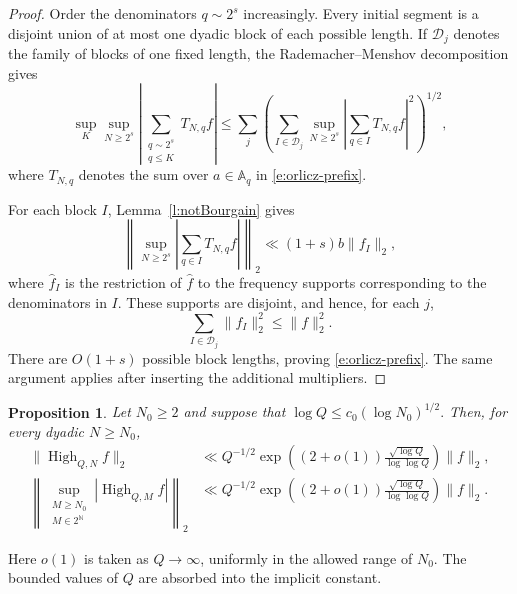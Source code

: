 \documentclass[12pt,reqno]{amsart}
\numberwithin{equation}{section}
\newtheorem{proposition}[equation]{Proposition}
\theoremstyle{definition}
\theoremstyle{remark}
\begin{document}
\begin{proof}
Order the denominators \(q\sim2^s\) increasingly.  Every initial
segment is a disjoint union of at most one dyadic block of each
possible length.  If \(\mathcal D_j\) denotes the family of blocks of
one fixed length, the Rademacher--Menshov decomposition gives
\[
 \sup_K\sup_{N\geq2^s}
 \left|\sum_{\substack{q\sim2^s\\q\leq K}}T_{N,q}f\right|
 \leq
 \sum_j
 \left(
 \sum_{I\in\mathcal D_j}
 \sup_{N\geq2^s}
 \left|\sum_{q\in I}T_{N,q}f\right|^2
 \right)^{1/2},
\]
where \(T_{N,q}\) denotes the sum over \(a\in\mathbb A_q\) in
\eqref{e:orlicz-prefix}.

For each block \(I\), Lemma~\ref{l:notBourgain} gives
\[
 \left\|
 \sup_{N\geq2^s}
 \left|\sum_{q\in I}T_{N,q}f\right|
 \right\|_2
 \ll (1+s)b\|f_I\|_2,
\]
where \(\widehat f_I\) is the restriction of \(\widehat f\) to the
frequency supports corresponding to the denominators in \(I\).
These supports are disjoint, and hence, for each \(j\),
\[
 \sum_{I\in\mathcal D_j}\|f_I\|_2^2\leq\|f\|_2^2.
\]
There are \(O(1+s)\) possible block lengths, proving
\eqref{e:orlicz-prefix}.  The same argument applies after inserting
the additional multipliers.
\end{proof}
\begin{proposition}\label{p:highupperbound}
Let $N_0\geq2$ and suppose that $\log Q\leq c_0(\log N_0)^{1/2}.$
Then, for every dyadic $N\geq N_0$,
\begin{align}
 \|\operatorname{High}_{Q,N}f\|_2
 &\ll Q^{-1/2}
 \exp\left(
 (2+o(1))\frac{\sqrt{\log Q}}{\log\log Q}
 \right)\|f\|_2,
 \label{e:highcontribution}\\
 \left\|
 \sup_{\substack{M\geq N_0\\M\in2^{\mathbb N}}}
 |\operatorname{High}_{Q,M}f|
 \right\|_2
 &\ll Q^{-1/2}
 \exp\left(
 (2+o(1))\frac{\sqrt{\log Q}}{\log\log Q}
 \right)\|f\|_2.
 \label{e:highcontributionmaximal}
\end{align}
\end{proposition}

Here \(o(1)\) is taken as \(Q\to\infty\), uniformly in the allowed
range of \(N_0\).  The bounded values of \(Q\) are absorbed into the
implicit constant.
\end{document}

